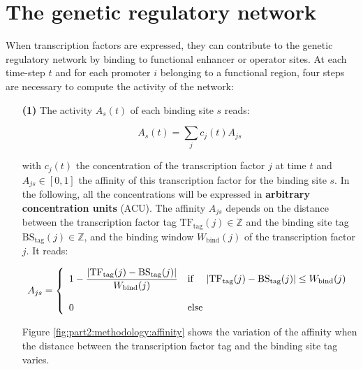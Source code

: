 
\section{The genetic regulatory network}
\label{sec:part2:methodology:grn}

When transcription factors are expressed, they can contribute to the genetic regulatory network by binding to functional enhancer or operator sites. At each time-step $t$ and for each promoter $i$ belonging to a functional region, four steps are necessary to compute the activity of the network:

\begin{enumerate}

\item[\textbf{(1)}] The activity $A_s(t)$ of each binding site $s$ reads:

\begin{equation}
\label{eq:part2:methodology:binding_site_activity}
A_s(t) = \sum_j c_j(t) A_{js}
\end{equation}

with $c_j(t)$ the concentration of the transcription factor $j$ at time $t$ and $A_{js} \in [0, 1]$ the affinity of this transcription factor for the binding site $s$. In the following, all the concentrations will be expressed in \textbf{arbitrary concentration units} (ACU).
The affinity $A_{js}$ depends on the distance between the transcription factor tag $\text{TF}_\text{tag}(j) \in \mathbb{Z}$ and the binding site tag $\text{BS}_\text{tag}(j) \in \mathbb{Z}$, and the binding window $W_\text{bind}(j)$ of the transcription factor $j$. It reads:

\begin{equation}
\label{eq:part2:methodology:affinity}
A_{js} = \left\{
\begin{array}{l l}
1-\dfrac{|\text{TF}_\text{tag}(j) - \text{BS}_\text{tag}(j)|}{W_\text{bind}(j)} & \text{if \quad $|\text{TF}_\text{tag}(j) - \text{BS}_\text{tag}(j)| \leq W_\text{bind}(j)$}\\\\
0 & \text{else}
\end{array}
\right.
\end{equation}

Figure \ref{fig:part2:methodology:affinity} shows the variation of the affinity when the distance between the transcription factor tag and the binding site tag varies.


\end{enumerate}
